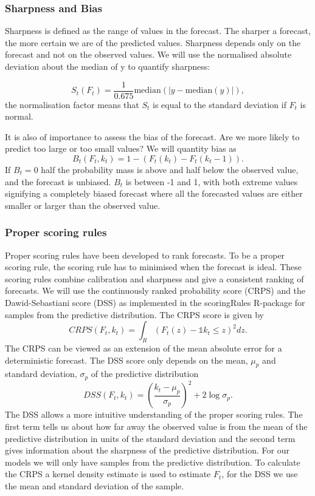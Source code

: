 \documentclass[12pt]{article}
\begin{document}
\subsubsection{Sharpness and Bias}
Sharpness is defined as the range of values in the forecast. The sharper a forecast, the more certain we are of the predicted values. Sharpness depends only on the forecast and not on the observed values. We will use the normalised absolute deviation about the median of y to quantify sharpness:

\[ S_t(F_t) = \frac{1}{0.675} \text{median}(|y - \text{median}(y)|),\]
the normalisation factor means that $S_t$ is equal to the standard deviation if $F_t$ is normal.

It is also of importance to assess the bias of the forecast. Are we more likely to predict too large or too small values? We will quantity bias as
\[B_t(F_t, k_t) = 1 - (F_t(k_t) - F_t(k_t - 1)).\]
If $B_t=0$ half the probability mass is above and half below the observed value, and the forecast is unbiased. $B_t$ is between -1 and 1, with both extreme values signifying a completely biased forecast where all the forecasted values are either smaller or larger than the observed value.

\subsubsection{Proper scoring rules}
Proper scoring rules have been developed to rank forecasts\cite{gneitingStrictlyProperScoring2007}. To be a proper scoring rule, the scoring rule has to minimised when the forecast is ideal. These scoring rules combine calibration and sharpness and give a consistent ranking of forecasts. We will use the continuously ranked probability score (CRPS) and the Dawid-Sebastiani score (DSS) as implemented in the scoringRules R-package \cite{jordanEvaluatingProbabilisticForecasts2018} for samples from the predictive distribution. The CRPS score is given by 
\[CRPS(F_t,k_t) = \int_R(F_t(z) - \mathds{1}{k_t \leq z})^2 dz.\] The CRPS can be viewed as an extension of the mean absolute error for a deterministic forecast. The DSS score only depends on the mean, $\mu_p$ and standard deviation, $\sigma_p$ of the predictive distribution
\[DSS(F_t, k_t) = \left(\frac{k_t- \mu_p}{\sigma_p}\right)^2 + 2\log\sigma_p.\]
The DSS allows a more intuitive understanding of the proper scoring rules. The first term tells us about how far away the observed value is from the mean of the predictive distribution in units of the standard deviation and the second term gives information about the sharpness of the predictive distribution. For our models we will only have samples from the predictive distribution. To calculate the CRPS a kernel density estimate is used to estimate $F_t$, for the DSS we use the mean and standard deviation of the sample. 
\end{document}
